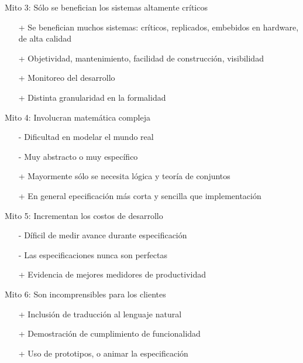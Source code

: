 \documentclass{beamer}
\begin{document}
\begin{frame}{Mito 3: S\'olo se benefician los sistemas altamente cr\'iticos}
\begin{itemize}[<+->]
\item[+] Se benefician muchos sistemas: cr\'iticos, replicados, embebidos en hardware, de alta calidad
\item[+] Objetividad, mantenimiento, facilidad de construcci\'on, visibilidad 
\item[+] Monitoreo del desarrollo
\item[+] Distinta granularidad en la formalidad
\end{itemize}
\end{frame}
 
\begin{frame}{Mito 4: Involucran matem\'atica compleja}
\begin{itemize}[<+->]
\item[-] Dificultad en modelar el mundo real
\item[-] Muy abstracto o muy espec\'ifico 
\item[+] Mayormente sólo se necesita l\'ogica y teor\'ia de conjuntos
\item[+] En general epecificaci\'on m\'as corta y sencilla que implementaci\'on
\end{itemize}
\end{frame}
 
\begin{frame}{Mito 5: Incrementan los costos de desarrollo}
\begin{itemize}[<+->]
\item[-] D\'ificil de medir avance durante especificaci\'on
\item[-] Las especificaciones nunca son perfectas
\item[+] Evidencia de mejores medidores de productividad
\end{itemize}
\end{frame}
 
\begin{frame}{Mito 6: Son incomprensibles para los clientes}
\begin{itemize}[<+->]
\item[+] Inclusi\'on de traducci\'on al lenguaje natural
\item[+] Demostraci\'on de cumplimiento de funcionalidad
\item[+] Uso de prototipos, o animar la especificaci\'on
\end{itemize}
\end{frame}
 
\end{document}
